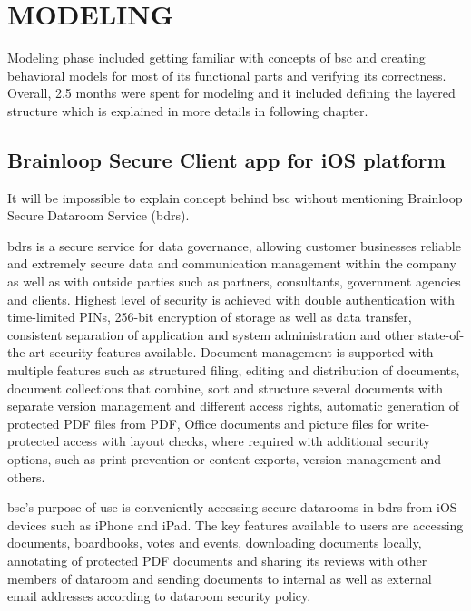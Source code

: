 \chapter{MODELING}
\label{chapter:modeling}

\par
Modeling phase included getting familiar with concepts of \acrshort{bsc} and creating behavioral models for most of its functional parts and verifying its correctness. Overall, 2.5 months were spent for modeling and it included defining the layered structure which is explained in more details in following chapter.

\section{Brainloop Secure Client app for iOS platform} 

\par
It will be impossible to explain concept behind \acrshort{bsc} without mentioning Brainloop Secure Dataroom Service (\acrshort{bdrs}). 

\par
\acrshort{bdrs} \cite{BDRS_Description} is a secure service for data governance, allowing customer businesses reliable and extremely secure data and communication management within the company as well as with outside parties such as partners, consultants, government agencies and clients. Highest level of security is achieved with double authentication with time-limited PINs, 256-bit encryption of storage as well as data transfer, consistent separation of application and system administration and other state-of-the-art security features available. Document management is supported with multiple features such as structured filing, editing and distribution of documents, document collections that combine, sort and structure several documents with separate version management and different access rights, automatic generation of protected PDF files from PDF, Office documents and picture files for write-protected access with layout checks, where required with additional security options, such as print prevention or content exports, version management and others.

\par
\acrshort{bsc}'s \cite{BSC_UserGuide} purpose of use is conveniently accessing secure datarooms in \acrshort{bdrs} from iOS devices such as iPhone and iPad. The key features available to users are accessing documents, boardbooks, votes and events, downloading documents locally, annotating of protected PDF documents and sharing its reviews with other members of dataroom and sending documents to internal as well as external email addresses according to dataroom security policy.

